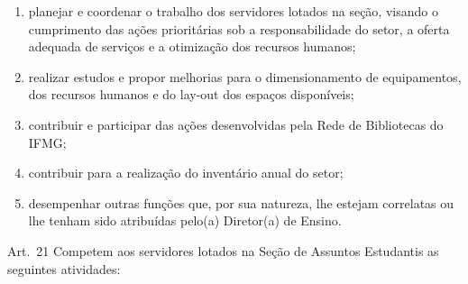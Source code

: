 \documentclass[a4paper,12pt]{report}
\begin{document}
\begin{enumerate}
\renewcommand{\labelenumi}{\Roman{enumi}}

\item planejar e coordenar o trabalho dos servidores lotados na seção, visando o 
      cumprimento das ações prioritárias sob a responsabilidade do setor, a oferta 
      adequada de serviços e a otimização dos recursos humanos;

\item realizar estudos e propor melhorias para o dimensionamento de equipamentos, dos 
      recursos humanos e do lay-out dos espaços disponíveis;

\item contribuir e participar das ações desenvolvidas pela Rede de Bibliotecas do IFMG; 

\item contribuir para a realização do inventário anual do setor;

\item desempenhar outras funções que, por sua natureza, lhe estejam correlatas ou lhe 
      tenham sido atribuídas pelo(a) Diretor(a) de Ensino.
\end{enumerate}


Art.~21 Competem aos servidores lotados na Seção de Assuntos Estudantis as seguintes 
atividades:
\end{document}
